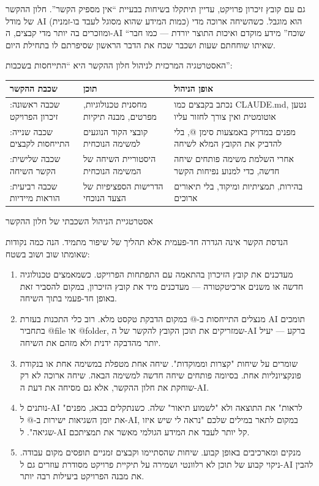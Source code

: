 
גם עם קובץ זיכרון פרויקט, עדיין תיתקלו בשיחות בבעיית “אין מספיק הקשר”. חלון ההקשר של מודל AI (כמות המידע שהוא מסוגל לעבד בו-זמנית) הוא מוגבל. כשהשיחה ארוכה מדי ומוזכרים בה יותר מדי קבצים, ה-AI “שוכח” מידע מוקדם ואיכות התוצר יורדת — כמו חבר שאיתו שוחחתם שעות ושכבר שכח את הדבר הראשון שסיפרתם לו בתחילת היום.

האסטרטגיה המרכזית לניהול חלון ההקשר היא “התייחסות בשכבות”:

\begin{center}
\begin{tabularx}{\linewidth}{|X|X|X|}
\hline
\textbf{שכבת ההקשר} & \textbf{תוכן} & \textbf{אופן הניהול} \tabularnewline
\hline
שכבה ראשונה: זיכרון הפרויקט & מחסנית טכנולוגיות, מפרטים, מבנה תיקיות & נכתב בקבצים כמו CLAUDE.md, נטען אוטומטית ואין צורך לחזור עליו \tabularnewline
שכבה שנייה: התייחסות לקבצים & קובצי הקוד הנוגעים למשימה הנוכחית & מפנים במדויק באמצעות סימן @, בלי להדביק את הקובץ המלא לשיחה \tabularnewline
שכבה שלישית: הקשר השיחה & היסטוריית השיחה של המשימה הנוכחית & אחרי השלמת משימה פותחים שיחה חדשה, כדי למנוע נפיחות הקשר \tabularnewline
שכבה רביעית: הוראות מיידיות & הדרישות הספציפיות של הצעד הנוכחי & בהירות, תמציתיות ומיקוד, בלי תיאורים ארוכים \tabularnewline
\hline
\end{tabularx}
\end{center}

\begin{center}\small\color{gray}אסטרטגיית הניהול השכבתי של חלון ההקשר\end{center}


הנדסת הקשר אינה הגדרה חד-פעמית אלא תהליך של שיפור מתמיד. הנה כמה נקודות שאומתו שוב ושוב בשטח:

\begin{enumerate}
  \item מעדכנים את קובץ הזיכרון בהתאמה עם התפתחות הפרויקט. כשמאמצים טכנולוגיה חדשה או משנים ארכיטקטורה — מעדכנים מיד את קובץ הזיכרון, במקום להסביר זאת באופן חד-פעמי בתוך השיחה.
  \item מנצלים התייחסות ב-@ במקום הדבקת טקסט מלא. רוב כלי התכנות בעזרת AI תומכים בתחביר @file או @folder, שמזריקים את תוכן הקובץ להקשר של ה-AI ברקע — יעיל יותר מהדבקה ידנית ולא מזהם את השיחה.
  \item שומרים על שיחות "קצרות וממוקדות". שיחה אחת מטפלת במשימה אחת או בנקודת פונקציונליות אחת. בסיומה פותחים שיחה חדשה למשימה הבאה. שיחה ארוכה לא רק שוחקת את חלון ההקשר, אלא גם מסיחה את דעת ה-AI.
  \item נותנים ל-AI "לראות" את התוצאה ולא "לשמוע תיאור" שלה. כשנתקלים בבאג, מפנים את יומן השגיאות ישירות ב-@ ל-AI, במקום לתאר במילים שלכם "נראה לי שיש איזו שגיאה". ל-AI קל יותר לעבד את המידע הגולמי מאשר את תמציתכם.
  \item מנקים ומארכיבים באופן קבוע. שיחות שהסתיימו וקבצים זמניים תופסים מקום עבודה. ניקוי קבוע של תוכן לא רלוונטי ושמירה על תיקיית פרויקט מסודרת עוזרים גם ל-AI להבין את מבנה הפרויקט ביעילות רבה יותר.
\end{enumerate}

